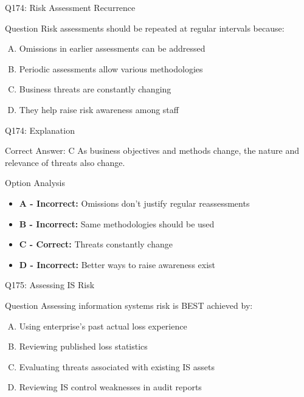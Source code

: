 \documentclass{beamer}
\begin{document}
	\begin{frame}{Q174: Risk Assessment Recurrence}
		\begin{block}{Question}
			Risk assessments should be repeated at regular intervals because:
		\end{block}
		\begin{enumerate}[(A)]
			\item Omissions in earlier assessments can be addressed
			\item Periodic assessments allow various methodologies
			\item Business threats are constantly changing
			\item They help raise risk awareness among staff
		\end{enumerate}
	\end{frame}
	
	\begin{frame}{Q174: Explanation}
		\begin{block}{Correct Answer: C}
			As business objectives and methods change, the nature and relevance of threats also change.
		\end{block}
		\begin{block}{Option Analysis}
			\begin{itemize}
				\item \textbf{A - Incorrect:} Omissions don't justify regular reassessments
				\item \textbf{B - Incorrect:} Same methodologies should be used
				\item \textbf{C - Correct:} Threats constantly change
				\item \textbf{D - Incorrect:} Better ways to raise awareness exist
			\end{itemize}
		\end{block}
	\end{frame}
	
	\begin{frame}{Q175: Assessing IS Risk}
		\begin{block}{Question}
			Assessing information systems risk is BEST achieved by:
		\end{block}
		\begin{enumerate}[(A)]
			\item Using enterprise's past actual loss experience
			\item Reviewing published loss statistics
			\item Evaluating threats associated with existing IS assets
			\item Reviewing IS control weaknesses in audit reports
		\end{enumerate}
	\end{frame}
	
\end{document}

